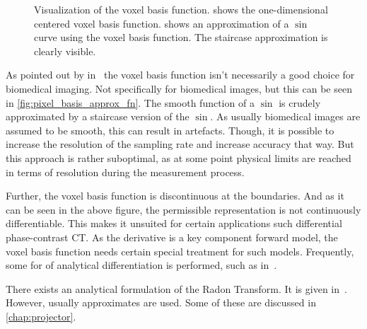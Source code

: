 \begin{figure}
	\centering
	\caption{Visualization of the voxel basis function. 
		shows the one-dimensional centered voxel basis function.
		 shows an approximation of a \(\sin\) curve using
		the voxel basis function. The staircase approximation is clearly visible.
	}\label{fig:pixel_basis_function}
\end{figure}

As pointed out by \citeauthor*{lewitt_multidimensional_1990}
in~\cite{lewitt_multidimensional_1990,lewitt_alternatives_1992} the voxel basis function isn't
necessarily a good choice for biomedical imaging. Not specifically for biomedical images, but this
can be seen in \autoref{fig:pixel_basis_approx_fn}. The smooth function of a \(\sin\) is crudely
approximated by a staircase version of the \(\sin\). As usually biomedical images are assumed to be
smooth, this can result in artefacts. Though, it is possible to increase the resolution of the
sampling rate and increase accuracy that way. But this approach is rather suboptimal, as at some
point physical limits are reached in terms of resolution during the measurement process.

Further, the voxel basis function is discontinuous at the boundaries. And as it can be seen in the
above figure, the permissible representation is not continuously differentiable. This makes it
unsuited for certain applications such differential phase-contrast CT\@. As the derivative is a key
component forward model, the voxel basis function needs certain special treatment for such models.
Frequently, some for of analytical differentiation is performed, such as
in~\cite{xu_investigation_2012}.

There exists an analytical formulation of the Radon Transform. It is given
in~\cite{toft_radon_1996}. However, usually approximates are used. Some of these are discussed in
\autoref{chap:projector}.

